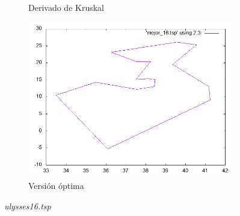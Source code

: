 \documentclass[12pt,spanish]{article}
\begin{document}
\begin{figure}[H]
\begin{subfigure}[b]{0.36\textwidth}
\caption{Derivado de Kruskal}
\end{subfigure}
\quad
\begin{subfigure}[b]{0.36\textwidth}
\includegraphics[width=\textwidth]{ulysses16_mejor.png}
\caption{Versión óptima}
\end{subfigure}
\caption{\textit{ulysses16.tsp}}
\end{figure}
\end{document}
